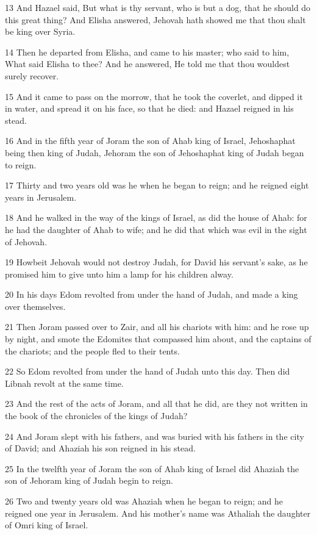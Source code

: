 \par 13 And Hazael said, But what is thy servant, who is but a dog, that he should do this great thing? And Elisha answered, Jehovah hath showed me that thou shalt be king over Syria.
\par 14 Then he departed from Elisha, and came to his master; who said to him, What said Elisha to thee? And he answered, He told me that thou wouldest surely recover.
\par 15 And it came to pass on the morrow, that he took the coverlet, and dipped it in water, and spread it on his face, so that he died: and Hazael reigned in his stead.
\par 16 And in the fifth year of Joram the son of Ahab king of Israel, Jehoshaphat being then king of Judah, Jehoram the son of Jehoshaphat king of Judah began to reign.
\par 17 Thirty and two years old was he when he began to reign; and he reigned eight years in Jerusalem.
\par 18 And he walked in the way of the kings of Israel, as did the house of Ahab: for he had the daughter of Ahab to wife; and he did that which was evil in the sight of Jehovah.
\par 19 Howbeit Jehovah would not destroy Judah, for David his servant's sake, as he promised him to give unto him a lamp for his children alway.
\par 20 In his days Edom revolted from under the hand of Judah, and made a king over themselves.
\par 21 Then Joram passed over to Zair, and all his chariots with him: and he rose up by night, and smote the Edomites that compassed him about, and the captains of the chariots; and the people fled to their tents.
\par 22 So Edom revolted from under the hand of Judah unto this day. Then did Libnah revolt at the same time.
\par 23 And the rest of the acts of Joram, and all that he did, are they not written in the book of the chronicles of the kings of Judah?
\par 24 And Joram slept with his fathers, and was buried with his fathers in the city of David; and Ahaziah his son reigned in his stead.
\par 25 In the twelfth year of Joram the son of Ahab king of Israel did Ahaziah the son of Jehoram king of Judah begin to reign.
\par 26 Two and twenty years old was Ahaziah when he began to reign; and he reigned one year in Jerusalem. And his mother's name was Athaliah the daughter of Omri king of Israel.

